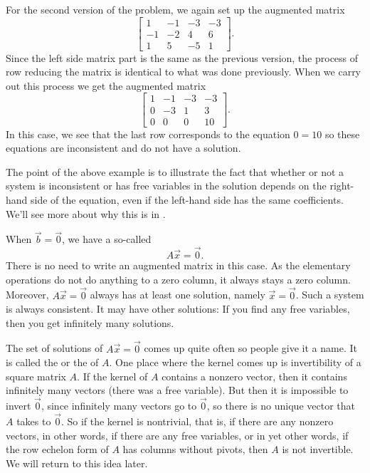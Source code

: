 \begin{exampleSol}
For the second version of the problem, we again set up the augmented matrix
\begin{equation*}
\left[ 
\begin{array}{ccc|c}
1 & -1 & -3 & -3 \\
-1 & -2 & 4 & 6 \\
1 & 5 & -5 & 1
\end{array}
\right].
\end{equation*}
Since the left side matrix part is the same as the previous version, the process of row reducing the matrix is identical to what was done previously. When we carry out this process we get the augmented matrix
\begin{equation*}
\left[ 
\begin{array}{ccc|c}
1 & -1 & -3 & -3 \\
0 & -3 & 1 & 3 \\
0 & 0 & 0 & 10
\end{array}
\right].
\end{equation*}
In this case, we see that the last row corresponds to the equation $0 = 10$ so these equations are inconsistent and do not have a solution.
\end{exampleSol}
The point of the above example is to illustrate the fact that whether or not a system is inconsistent or has free variables in the solution depends on the right-hand side of the equation, even if the left-hand side has the same coefficients. We'll see more about why this is in .
\medskip

When $\vec{b} = \vec{0}$, we have a so-called
\emph{}
\begin{equation*}
A \vec{x} = \vec{0} .
\end{equation*}
There is no need to write an augmented matrix in this
case.  As the elementary operations do not do anything to a zero column, it
always stays a zero column.  Moreover, $A \vec{x} = \vec{0}$ always has at
least one solution, namely $\vec{x} = \vec{0}$.  Such a system
is always consistent.  It may have other solutions:  If you find
any free variables, then you get infinitely many solutions.

The set of solutions of $A \vec{x} = \vec{0}$ comes up quite often
so people give it a name.  It is called the
\emph{} or the 
\emph{} of $A$.
One place where the kernel comes up is invertibility of a square matrix $A$.
If the kernel of $A$ contains a nonzero vector, then it contains
infinitely many vectors (there was a free variable).  But then it is
impossible to invert $\vec{0}$, since infinitely many vectors go to
$\vec{0}$, so there is no unique vector that $A$ takes to $\vec{0}$.
So if the kernel is nontrivial, that is, if there are any nonzero vectors,
in other words, if there are any free variables, or in yet other words,
if the row echelon form of $A$ has columns without pivots,
then $A$ is not invertible.  We will return to this idea later.


